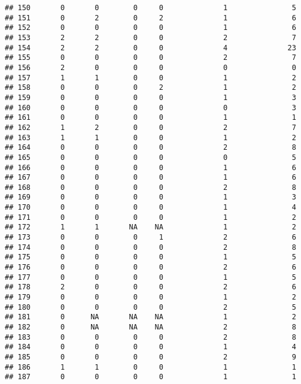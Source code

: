 \documentclass[
]{article}
\begin{document}
\begin{verbatim}
## 150       0       0        0     0              1               5
## 151       0       2        0     2              1               6
## 152       0       0        0     0              1               6
## 153       2       2        0     0              2               7
## 154       2       2        0     0              4              23
## 155       0       0        0     0              2               7
## 156       2       0        0     0              0               0
## 157       1       1        0     0              1               2
## 158       0       0        0     2              1               2
## 159       0       0        0     0              1               3
## 160       0       0        0     0              0               3
## 161       0       0        0     0              1               1
## 162       1       2        0     0              2               7
## 163       1       1        0     0              1               2
## 164       0       0        0     0              2               8
## 165       0       0        0     0              0               5
## 166       0       0        0     0              1               6
## 167       0       0        0     0              1               6
## 168       0       0        0     0              2               8
## 169       0       0        0     0              1               3
## 170       0       0        0     0              1               4
## 171       0       0        0     0              1               2
## 172       1       1       NA    NA              1               2
## 173       0       0        0     1              2               6
## 174       0       0        0     0              2               8
## 175       0       0        0     0              1               5
## 176       0       0        0     0              2               6
## 177       0       0        0     0              1               5
## 178       2       0        0     0              2               6
## 179       0       0        0     0              1               2
## 180       0       0        0     0              2               5
## 181       0      NA       NA    NA              1               2
## 182       0      NA       NA    NA              2               8
## 183       0       0        0     0              2               8
## 184       0       0        0     0              1               4
## 185       0       0        0     0              2               9
## 186       1       1        0     0              1               1
## 187       0       0        0     0              1               1

\end{verbatim}
\end{document}
